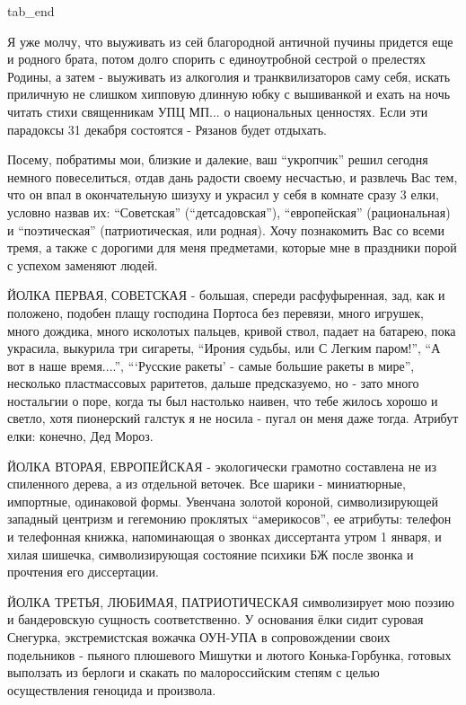 tab_end
\fi

Я уже молчу, что выуживать из сей благородной античной пучины придется еще и
родного брата, потом долго спорить с единоутробной сестрой о прелестях Родины,
а затем - выуживать из алкоголия и транквилизаторов саму себя, искать приличную
не слишком хипповую длинную юбку с вышиванкой и ехать на ночь читать стихи
священникам УПЦ МП... о национальных ценностях. Если эти парадоксы 31 декабря
состоятся - Рязанов будет отдыхать.








Посему, побратимы мои, близкие и далекие, ваш \enquote{укропчик} решил сегодня немного
повеселиться, отдав дань радости своему несчастью, и развлечь Вас тем, что он
впал в окончательную шизуху и украсил у себя в комнате сразу 3 елки, условно
назвав их: \enquote{Советская} (\enquote{детсадовская}), \enquote{европейская} (рациональная) и
\enquote{поэтическая} (патриотическая, или родная). Хочу познакомить Вас со всеми
тремя, а также с дорогими для меня предметами, которые мне в праздники порой с
успехом заменяют людей. 

ЙОЛКА ПЕРВАЯ, СОВЕТСКАЯ - большая, спереди расфуфыренная, зад, как и положено,
подобен плащу господина Портоса без перевязи, много игрушек, много дождика,
много исколотых пальцев, кривой ствол, падает на батарею, пока украсила,
выкурила три сигареты, \enquote{Ирония судьбы, или С Легким паром!}, \enquote{А
вот в наше время....}, \enquote{\enquote{Русские ракеты} - самые большие ракеты
в мире}, несколько пластмассовых раритетов, дальше предсказуемо, но - зато
много ностальгии о поре, когда ты был настолько наивен, что тебе жилось хорошо
и светло, хотя пионерский галстук я не носила - пугал он меня даже тогда.
Атрибут елки: конечно, Дед Мороз. 

ЙОЛКА ВТОРАЯ, ЕВРОПЕЙСКАЯ - экологически грамотно составлена не из спиленного
дерева, а из отдельной веточек. Все шарики - миниатюрные, импортные, одинаковой
формы. Увенчана золотой короной, символизирующей западный центризм и гегемонию
проклятых \enquote{америкосов}, ее атрибуты: телефон и телефонная книжка, напоминающая
о звонках диссертанта утром 1 января, и хилая шишечка, символизирующая
состояние психики БЖ после звонка и прочтения его диссертации.

ЙОЛКА ТРЕТЬЯ, ЛЮБИМАЯ, ПАТРИОТИЧЕСКАЯ символизирует мою поэзию и бандеровскую
сущность соответственно. У основания ёлки сидит суровая Снегурка,
экстремистская вожачка ОУН-УПА в сопровождении своих подельников - пьяного
плюшевого Мишутки и лютого Конька-Горбунка, готовых выползать из берлоги и
скакать по малороссийским степям с целью осуществления геноцида и произвола.

